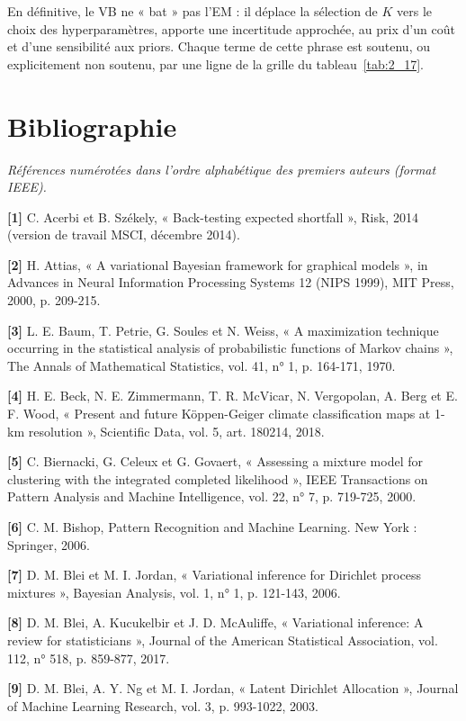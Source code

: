 En définitive, le VB ne « bat » pas l'EM : il déplace la sélection de $K$ vers le choix des hyperparamètres, apporte une incertitude approchée, au prix d'un coût et d'une sensibilité aux priors. Chaque terme de cette phrase est soutenu, ou explicitement non soutenu, par une ligne de la grille du tableau~\ref{tab:2_17}.


\chapter*{Bibliographie}
\emph{Références numérotées dans l’ordre alphabétique des premiers auteurs (format IEEE).}

\textbf{[1]  }C. Acerbi et B. Székely, « Back-testing expected shortfall », Risk, 2014 (version de travail MSCI, décembre 2014).

\textbf{[2]  }H. Attias, « A variational Bayesian framework for graphical models », in Advances in Neural Information Processing Systems 12 (NIPS 1999), MIT Press, 2000, p. 209-215.

\textbf{[3]  }L. E. Baum, T. Petrie, G. Soules et N. Weiss, « A maximization technique occurring in the statistical analysis of probabilistic functions of Markov chains », The Annals of Mathematical Statistics, vol. 41, n° 1, p. 164-171, 1970.

\textbf{[4]  }H. E. Beck, N. E. Zimmermann, T. R. McVicar, N. Vergopolan, A. Berg et E. F. Wood, « Present and future Köppen-Geiger climate classification maps at 1-km resolution », Scientific Data, vol. 5, art. 180214, 2018.

\textbf{[5]  }C. Biernacki, G. Celeux et G. Govaert, « Assessing a mixture model for clustering with the integrated completed likelihood », IEEE Transactions on Pattern Analysis and Machine Intelligence, vol. 22, n° 7, p. 719-725, 2000.

\textbf{[6]  }C. M. Bishop, Pattern Recognition and Machine Learning. New York : Springer, 2006.

\textbf{[7]  }D. M. Blei et M. I. Jordan, « Variational inference for Dirichlet process mixtures », Bayesian Analysis, vol. 1, n° 1, p. 121-143, 2006.

\textbf{[8]  }D. M. Blei, A. Kucukelbir et J. D. McAuliffe, « Variational inference: A review for statisticians », Journal of the American Statistical Association, vol. 112, n° 518, p. 859-877, 2017.

\textbf{[9]  }D. M. Blei, A. Y. Ng et M. I. Jordan, « Latent Dirichlet Allocation », Journal of Machine Learning Research, vol. 3, p. 993-1022, 2003.


